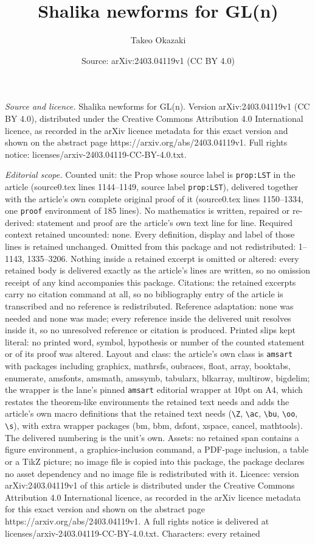 \documentclass[10pt,a4paper]{amsart}
\title[Shalika newforms for GL(n)]{Shalika newforms for GL(n)}
\author{Takeo Okazaki}
\date{Source: arXiv:2403.04119v1 (CC BY 4.0)}
\begin{document}
\maketitle

\noindent\emph{Source and licence.} Shalika newforms for GL(n). Version arXiv:2403.04119v1 (CC BY 4.0), distributed under the Creative Commons Attribution 4.0 International licence, as recorded in the arXiv licence metadata for this exact version and shown on the abstract page https://arxiv.org/abs/2403.04119v1. Full rights notice: licenses/arxiv-2403.04119-CC-BY-4.0.txt.\par\smallskip

\noindent\textit{Editorial scope.} Counted unit: the Prop whose source label is \texttt{prop:LST} in the article (source0.tex lines 1144--1149, source label \texttt{prop:LST}), delivered together with the article's own complete original proof of it (source0.tex lines 1150--1334, one \texttt{proof} environment of 185 lines). No mathematics is written, repaired or re-derived: statement and proof are the article's own text line for line. Required context retained uncounted: none. Every definition, display and label of those lines is retained unchanged. Omitted from this package and not redistributed: 1--1143, 1335--3206. Nothing inside a retained excerpt is omitted or altered: every retained body is delivered exactly as the article's lines are written, so no omission receipt of any kind accompanies this package. Citations: the retained excerpts carry no citation command at all, so no bibliography entry of the article is transcribed and no reference is redistributed. Reference adaptation: none was needed and none was made; every reference inside the delivered unit resolves inside it, so no unresolved reference or citation is produced. Printed slips kept literal: no printed word, symbol, hypothesis or number of the counted statement or of its proof was altered. Layout and class: the article's own class is \texttt{amsart} with packages including graphicx, mathrsfs, oubraces, float, array, booktabs, enumerate, amsfonts, amsmath, amssymb, tabularx, blkarray, multirow, bigdelim; the wrapper is the lane's pinned \texttt{amsart} editorial wrapper at 10pt on A4, which restates the theorem-like environments the retained text needs and adds the article's own macro definitions that the retained text needs (\texttt{\textbackslash Z}, \texttt{\textbackslash ac}, \texttt{\textbackslash bu}, \texttt{\textbackslash oo}, \texttt{\textbackslash s}), with extra wrapper packages (bm, bbm, dsfont, xspace, cancel, mathtools). The delivered numbering is the unit's own. Assets: no retained span contains a figure environment, a graphics-inclusion command, a PDF-page inclusion, a table or a TikZ picture; no image file is copied into this package, the package declares no asset dependency and no image file is redistributed with it. Licence: version arXiv:2403.04119v1 of this article is distributed under the Creative Commons Attribution 4.0 International licence, as recorded in the arXiv licence metadata for this exact version and shown on the abstract page https://arxiv.org/abs/2403.04119v1. A full rights notice is delivered at licenses/arxiv-2403.04119-CC-BY-4.0.txt. Characters: every retained 
\end{document}
